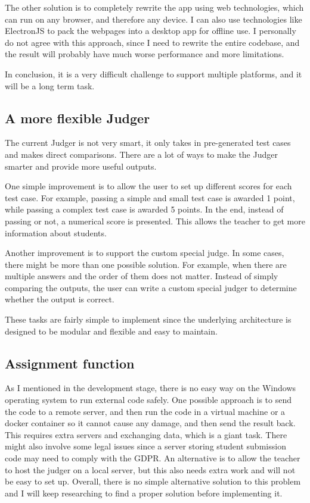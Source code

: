 \documentclass[report.tex]{subfiles}
\begin{document}
The other solution is to completely rewrite the app using web technologies, which can run on any browser, and therefore any device. I can also use technologies like ElectronJS\cite{electron} to pack the webpages into a desktop app for offline use. I personally do not agree with this approach, since I need to rewrite the entire codebase, and the result will probably have much worse performance and more limitations.

In conclusion, it is a very difficult challenge to support multiple platforms, and it will be a long term task.

\subsection{A more flexible Judger}

The current Judger is not very smart, it only takes in pre-generated test cases and makes direct comparisons. There are a lot of ways to make the Judger smarter and provide more useful outputs.

One simple improvement is to allow the user to set up different scores for each test case. For example, passing a simple and small test case is awarded 1 point, while passing a complex test case is awarded 5 points. In the end, instead of passing or not, a numerical score is presented. This allows the teacher to get more information about students.

Another improvement is to support the custom special judge. In some cases, there might be more than one possible solution. For example, when there are multiple answers and the order of them does not matter. Instead of simply comparing the outputs, the user can write a custom special judger to determine whether the output is correct.

These tasks are fairly simple to implement since the underlying architecture is designed to be modular and flexible and easy to maintain.

\subsection{Assignment function}

As I mentioned in the development stage, there is no easy way on the Windows operating system to run external code safely. One possible approach is to send the code to a remote server, and then run the code in a virtual machine or a docker container so it cannot cause any damage, and then send the result back. This requires extra servers and exchanging data, which is a giant task. There might also involve some legal issues since a server storing student submission code may need to comply with the GDPR. An alternative is to allow the teacher to host the judger on a local server, but this also needs extra work and will not be easy to set up. Overall, there is no simple alternative solution to this problem and I will keep researching to find a proper solution before implementing it.
\end{document}
